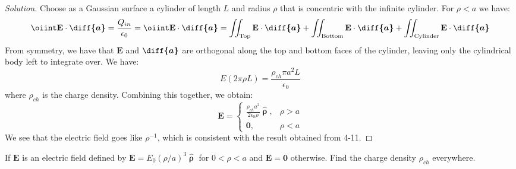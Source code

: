 \documentclass[crop=false,class=article,oneside]{standalone}
\begin{document}
        \begin{proof}[Solution]
            Choose as a Gaussian surface a cylinder of length
            $L$ and radius $\rho$ that is concentric with the
            infinite cylinder. For $\rho<a$ we have:
            \begin{equation*}
                \oiint\mathbf{E}\cdot\boldsymbol{\diff{a}}
                =\frac{Q_{in}}{\epsilon_{0}}
                =\oiint\mathbf{E}\cdot\boldsymbol{\diff{a}}
                =\iint_{\textrm{Top}}
                \mathbf{E}\cdot\boldsymbol{\diff{a}}
                +\iint_{\textrm{Bottom}}
                \mathbf{E}\cdot\boldsymbol{\diff{a}}
                +\iint_{\textrm{Cylinder}}
                \mathbf{E}\cdot\boldsymbol{\diff{a}}
            \end{equation*}
            From symmetry, we have that $\mathbf{E}$ and
            $\boldsymbol{\diff{a}}$ are orthogonal along the
            top and bottom faces of the cylinder, leaving only
            the cylindrical body left to integrate over. We have:
            \begin{equation*}
                E(2\pi\rho{L})
                =\frac{\rho_{ch}\pi{a}^{2}L}{\epsilon_{0}}
            \end{equation*}
            where $\rho_{ch}$ is the charge density.
            Combining this together, we obtain:
            \begin{equation*}
                \mathbf{E}=
                \begin{cases}
                    \frac{\rho_{ch}a^{2}}{2\epsilon_{0}\rho}
                    \hat{\boldsymbol{\uprho}},
                    &\rho>a\\
                    \mathbf{0},&\rho<a
                \end{cases}
            \end{equation*}
            We see that the electric field goes like $\rho^{-1}$,
            which is consistent with the result obtained from 4-11.
        \end{proof}
        \begin{problem}[Wangsness 4-11]
            If $\mathbf{E}$ is an electric field defined by
            $\mathbf{E}=E_{0}(\rho/a)^{3}\hat{\boldsymbol{\uprho}}$
            for $0<\rho<a$ and $\mathbf{E}=\mathbf{0}$ otherwise.
            Find the charge density $\rho_{ch}$ everywhere.
        \end{problem}
\end{document}
